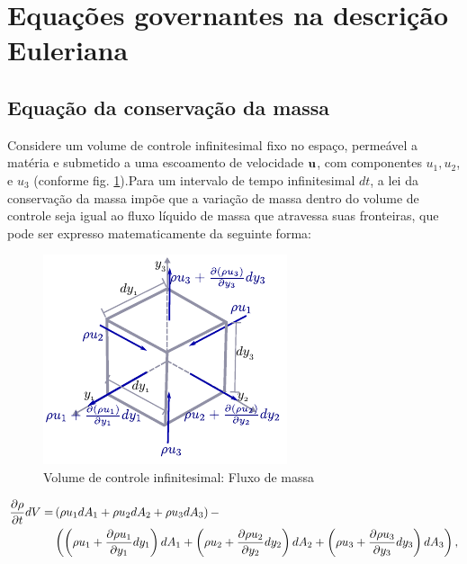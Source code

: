 \documentclass[tese_patricia]{subfiles}%
\begin{document}
\section{Equações governantes na descrição Euleriana} 


\subsection{Equação da conservação da massa}


Considere um volume de controle infinitesimal fixo no espaço, permeável a matéria e submetido a uma escoamento de velocidade $\mathbf{u}$, com componentes $u_1, u_2$, e $u_3$ (conforme fig. \ref{fig:VolInfi}).Para um intervalo de tempo infinitesimal $dt$, a lei da conservação da massa impõe que a variação de massa dentro do volume de controle seja igual ao fluxo líquido de massa que atravessa suas fronteiras, que pode ser expresso matematicamente da seguinte forma:

\begin{figure}[htb!]
	\centering 
	\includegraphics[scale=1.5,trim=0cm 0.0cm 0cm 0.0cm, clip=true]{Imagens/Cap2/conserMassa.pdf}	
	\caption{Volume de controle infinitesimal: Fluxo de massa}
	\label{fig:VolInfi}
\end{figure}


\begin{align}
	\begin{split}
	\frac{\partial \rho}{\partial t}dV =& \left(\rho u_1 dA_{1}  +  \rho u_2 dA_{2} + \rho u_3  dA_{3} \right) - \\  &\left(\left(\rho u_1 + \frac{\partial \rho u_1}{\partial y_1}dy_1 \right)dA_{1} + \left(\rho u_2+ \frac{\partial \rho u_2}{\partial y_2}dy_2 \right) dA_{2} + \left(\rho u_3 + \frac{\partial \rho u_3}{\partial y_3}dy_3 \right) dA_{3}\right), \label{eq:conserMassa1} 
	\end{split}
\end{align}
\end{document}
